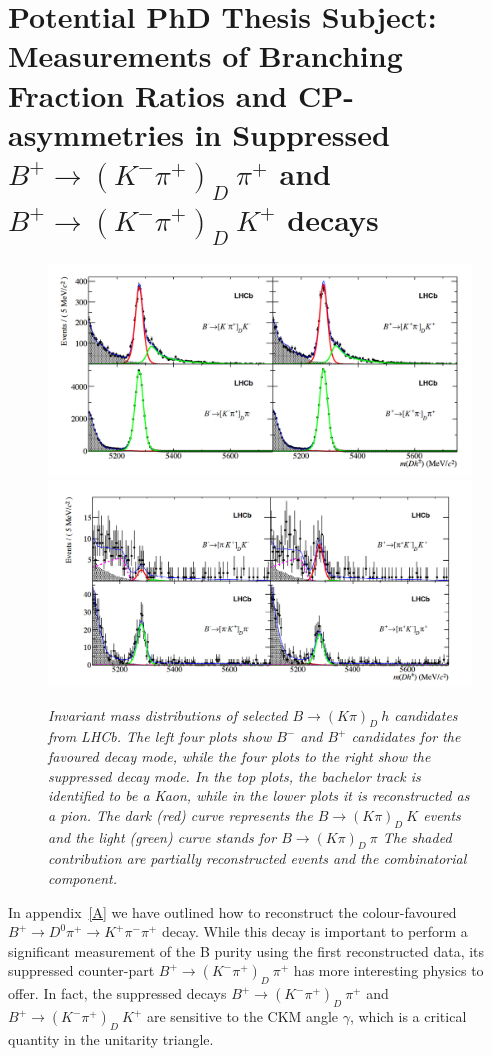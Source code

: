 \documentclass[a4paper,11pt]{article}
\begin{document}
\section{Potential PhD Thesis Subject: Measurements of Branching Fraction Ratios and CP-asymmetries in Suppressed $B^{+} \rightarrow (K^{-}  \pi^{+})_D~ \pi^{+}$ and $B^{+} \rightarrow (K^{-}  \pi^{+})_D~K^{+}$ decays}
 \begin{figure}[htb]
\centering
\includegraphics[scale=0.25]{LHCB-fav} 
\includegraphics[scale=0.25]{LHCB-sup}
\caption{\it Invariant mass distributions of selected $ B \rightarrow  (K \pi)_D ~ h$ candidates from LHCb. The left four plots show $B^-$ and $B^+$ candidates for the favoured decay mode, while the four plots to the right show the suppressed decay mode. In the top plots, the bachelor track is identified to be a Kaon, while in the lower plots it is reconstructed as a pion. The dark (red) curve represents the  $B \rightarrow  (K \pi)_D ~ K$ events and the light (green) curve stands for $B \rightarrow  (K \pi)_D ~ \pi$  The shaded contribution are partially reconstructed events and the combinatorial component.\label{fig:lhcb}}
\end{figure}

In appendix~\ref{A} we have outlined how to reconstruct the  colour-favoured $B^{+} \rightarrow D^0 \pi^{+} \rightarrow K^{+}  \pi^{-} \pi^{+}$ decay. While this decay is important to perform a significant measurement of the B purity using the first reconstructed data, its suppressed counter-part $B^{+} \rightarrow (K^{-}  \pi^{+})_D~ \pi^{+}$ has more interesting physics to offer. In fact, the suppressed decays $B^{+} \rightarrow  (K^{-}  \pi^{+})_D~ \pi^{+}$ and $B^{+} \rightarrow (K^{-}  \pi^{+})_D~ K^{+}$ are sensitive to the CKM angle $\gamma$, which is a critical quantity in the unitarity triangle. 
\end{document}
